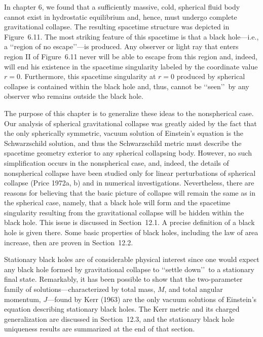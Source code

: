 
\begingroup
\edef\chaptertwelvepreviousfootnote{\number\value{footnote}}
\setcounter{footnote}{0}
\renewcommand{\thetheorem}{\thesubsection.\arabic{theorem}}

In chapter 6, we found that a sufficiently massive, cold, spherical fluid body cannot
exist in hydrostatic equilibrium and, hence, must undergo complete gravitational
collapse. The resulting spacetime structure was depicted in Figure~6.11. The most
striking feature of this spacetime is that a black hole---i.e., a \lq\lq region of no
escape\rq\rq---is produced. Any observer or light ray that enters region II of
Figure~6.11 never will be able to escape from this region and, indeed, will end his
existence in the spacetime singularity labeled by the coordinate value \(r=0\).
Furthermore, this spacetime singularity at \(r=0\) produced by spherical collapse is
contained within the black hole and, thus, cannot be \lq\lq seen\rq\rq\ by any observer
who remains outside the black hole.

The purpose of this chapter is to generalize these ideas to the nonspherical case.
Our analysis of spherical gravitational collapse was greatly aided by the fact that the
only spherically symmetric, vacuum solution of Einstein's equation is the
Schwarzschild solution, and thus the Schwarzschild metric must describe the
spacetime geometry exterior to any spherical collapsing body. However, no such
simplification occurs in the nonspherical case, and, indeed, the details of
nonspherical collapse have been studied only for linear perturbations of spherical
collapse (Price 1972a, b) and in numerical investigations. Nevertheless, there are
reasons for believing that the basic picture of collapse will remain the same as in the
spherical case, namely, that a black hole will form and the spacetime singularity
resulting from the gravitational collapse will be hidden within the black hole. This
issue is discussed in Section~12.1. A precise definition of a black hole is given
there. Some basic properties of black holes, including the law of area increase, then
are proven in Section~12.2.

Stationary black holes are of considerable physical interest since one would expect
any black hole formed by gravitational collapse to \lq\lq settle down\rq\rq\ to a
stationary final state. Remarkably, it has been possible to show that the two-parameter
family of solutions---characterized by total mass, \(M\), and total angular momentum,
\(J\)---found by Kerr (1963) are the only vacuum solutions of Einstein's equation
describing stationary black holes. The Kerr metric and its charged generalization are
discussed in Section~12.3, and the stationary black hole uniqueness results are
summarized at the end of that section.

